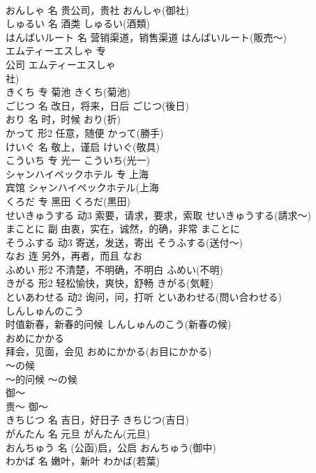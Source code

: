 \documentclass[8pt]{extreport}
\begin{document}
\begin{CJK}{UTF8}{min}
\\	おんしゃ	名	贵公司，贵社	おんしゃ(御社)	
\\	しゅるい	名	酒类	しゅるい(酒類)	
\\	はんばいルート	名	营销渠道，销售渠道	はんばいルート(販売～)	
\\	エムティーエスしゃ	专	
\\	公司	エムティーエスしゃ
\\	社)	
\\	きくち	专	菊池	きくち(菊池)	
\\	ごじつ	名	改日，将来，日后	ごじつ(後日)	
\\	おり	名	时，时候	おり(折)	
\\	かって	形2	任意，随便	かって(勝手)	
\\	けいぐ	名	敬上，谨启	けいぐ(敬具)	
\\	こういち	专	光一	こういち(光一)	
\\	シャンハイペックホテル	专	上海
\\	宾馆	シャンハイペックホテル(上海
\\	くろだ	专	黑田	くろだ(黒田)	
\\	せいきゅうする	动3	索要，请求，要求，索取	せいきゅうする(請求～)	
\\	まことに	副	由衷，实在，诚然，的确，非常	まことに	
\\	そうふする	动3	寄送，发送，寄出	そうふする(送付～)	
\\	なお	连	另外，再者，而且	なお	
\\	ふめい	形2	不清楚，不明确，不明白	ふめい(不明)	
\\	きがる	形2	轻松愉快，爽快，舒畅	きがる(気軽)	
\\	といあわせる	动2	询问，问，打听	といあわせる(問い合わせる)	
\\	しんしゅんのこう	
\\	时值新春，新春的问候	しんしゅんのこう(新春の候)	
\\	おめにかかる	
\\	拜会，见面，会见	おめにかかる(お目にかかる)	
\\	～の候	
\\	～的问候	～の候	
\\	御～	
\\	贵～	御～	
\\	きちじつ	名	吉日，好日子	きちじつ(吉日)	
\\	がんたん	名	元旦	がんたん(元旦)	
\\	おんちゅう	名	(公函)启，公启	おんちゅう(御中)	
\\	わかば	名	嫩叶，新叶	わかば(若葉)	

\end{CJK}
\end{document}
